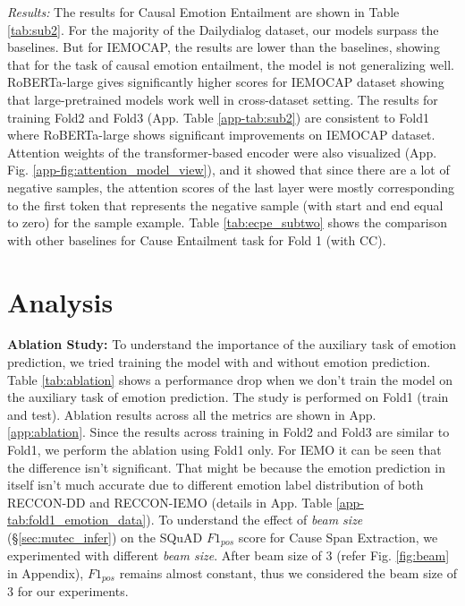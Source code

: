 \documentclass{article}
\begin{document}
\noindent\textit{Results:} The results for Causal Emotion Entailment are shown in Table \ref{tab:sub2}. For the majority of the Dailydialog dataset, our models surpass the baselines. But for IEMOCAP, the results are lower than the baselines, showing that for the task of causal emotion entailment, the model is not generalizing well. RoBERTa-large gives significantly higher scores for IEMOCAP dataset showing that large-pretrained models work well in cross-dataset setting. The results for training Fold2 and Fold3 (App. Table \ref{app-tab:sub2}) are consistent to Fold1 where RoBERTa-large shows significant improvements on IEMOCAP dataset. Attention weights of the transformer-based encoder were also visualized (App. Fig. \ref{app-fig:attention_model_view}), and it showed that since there are a lot of negative samples, the attention scores of the last layer were mostly corresponding to the first token that represents the negative sample (with start and end equal to zero) for the sample example. Table \ref{tab:ecpe_subtwo} shows the comparison with other baselines for Cause Entailment task for Fold 1 (with CC). \section{Analysis} \label{sec:analysis}
\vspace{-3mm}
\noindent\textbf{Ablation Study:} To understand the importance of the auxiliary task of emotion prediction, we tried training the model with and without emotion prediction. Table \ref{tab:ablation} shows a performance drop when we don't train the model on the auxiliary task of emotion prediction. The study is performed on Fold1 (train and test). Ablation results across all the metrics are shown in App. \ref{app:ablation}. Since the results across training in Fold2 and Fold3 are similar to Fold1, we perform the ablation using Fold1 only. For IEMO it can be seen that the difference isn't significant. That might be because the emotion prediction in itself isn't much accurate due to different emotion label distribution of both RECCON-DD and RECCON-IEMO (details in App. Table \ref{app-tab:fold1_emotion_data}).
To understand the effect of \textit{beam size} (\S \ref{sec:mutec_infer}) on the SQuAD $F1_{pos}$ score for Cause Span Extraction, we experimented with different \textit{beam size}. After beam size of 3 (refer Fig. \ref{fig:beam} in Appendix), $F1_{pos}$ remains almost constant, thus we considered the beam size of 3 for our experiments. 
\end{document}
